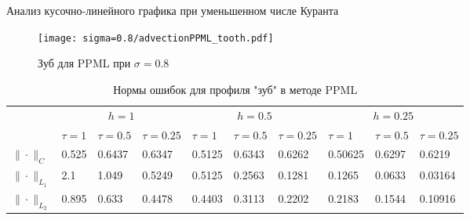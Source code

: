 \documentclass[unicode, 8pt]{beamer}
\begin{document}
    \begin{frame}{Анализ кусочно-линейного графика при уменьшенном числе Куранта}
        \begin{figure}[h]
            \centering
            \texttt{[image: sigma=0.8/advectionPPML\_tooth.pdf]}
            \caption{Зуб для PPML при $ \sigma = 0.8 $}
            \label{fig:ppml_tooth_08}
        \end{figure}
        \begin{table}[h]
            \centering
            \caption{Нормы ошибок для профиля "зуб" в методе PPML}
            \label{table:toothPPML}
            \scalebox{0.75} {
                \begin{tabular}{|*{10}{C{.45in}|}}
                    \hline
                    &  &  &  \\
                    & $\tau=1$ & $\tau=0.5$ & $\tau=0.25$ & $\tau=1$ & $\tau=0.5$ & $\tau=0.25$ & $\tau=1$ & $\tau=0.5$ & $\tau=0.25$ 
                    \\ \hline
                    $\| \cdot \|_{C}$ & 0.525 & 0.6437 & 0.6347 & 0.5125 & 0.6343 & 0.6262 & 0.50625 & 0.6297 & 0.6219
                    \\ \hline
                    $\| \cdot \|_{L_1}$ & 2.1 & 1.049 & 0.5249 & 0.5125 & 0.2563 & 0.1281 & 0.1265 & 0.0633 & 0.03164 
                    \\ \hline
                    $\| \cdot \|_{L_2}$ & 0.895 & 0.633 & 0.4478 & 0.4403 & 0.3113 & 0.2202 & 0.2183 & 0.1544 & 0.10916
                    \\ \hline
                \end{tabular}
            }
        \end{table}
    \end{frame}
\end{document}
